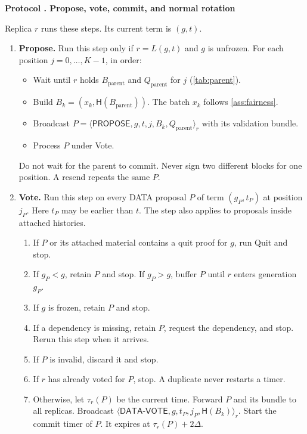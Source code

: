 \documentclass[11pt,a4paper]{article}
\newcommand{\RR}[1]{{\color{rrRed}#1}}
\newcommand{\Hash}{\mathsf H}
\newcommand{\tagg}[1]{\ensuremath{\mathsf{#1}}}
\newcounter{protocol}
\newenvironment{protocol}[2]{\refstepcounter{protocol}\label{#1}
\begin{mdframed}[nobreak=true,linewidth=.6pt,skipabove=8pt,skipbelow=8pt,
innertopmargin=7pt,innerbottommargin=7pt]\small
\textbf{Protocol \theprotocol. #2}\par\smallskip}{\end{mdframed}}
\begin{document}
\begin{protocol}{alg:steady}{Propose, vote, commit, and normal rotation}
Replica $r$ runs these steps. Its current term is $(g,t)$.
\begin{enumerate}[label=\textbf{\arabic*)},itemsep=5pt]
\item \textbf{Propose.} Run this step only if $r=L(g,t)$
\RR{and $g$ is unfrozen}.
For each position $j=0,\ldots,K-1$, in order:
 \begin{itemize}
 \item Wait until $r$ holds $B_{\mathrm{parent}}$ and
       $Q_{\mathrm{parent}}$ for $j$ \RR{(\cref{tab:parent})}.
 \item Build $B_k=(x_k,\Hash(B_{\mathrm{parent}}))$.
       The batch $x_k$ follows \cref{ass:fairness}.
 \item Broadcast
       $P=\langle\tagg{PROPOSE},g,t,j,B_k,Q_{\mathrm{parent}}\rangle_r$
       with its validation bundle.
 \item Process $P$ under Vote.
 \end{itemize}
 Do not wait for the parent to commit. Never sign two different
 blocks for one position. A resend repeats the same $P$.

\item \textbf{Vote.} Run this step on every DATA proposal $P$
of term $(g_P,t_P)$ at position $j_P$. \RR{Here $t_P$ may be earlier
than $t$. The step also applies to proposals inside attached histories.}
 \begin{enumerate}[label=(\alph*)]
 \item \RR{If $P$ or its attached material contains a quit proof for $g$,
       run Quit and stop.}
 \item If $g_P<g$, retain $P$ and stop. If $g_P>g$, buffer $P$
       until $r$ enters generation $g_P$.
 \item \RR{If $g$ is frozen, retain $P$ and stop.}
 \item If a dependency is missing, retain $P$, request the dependency,
       and stop. Rerun this step when it arrives.
 \item If $P$ is invalid, discard it and stop.
 \item If $r$ has already voted for $P$, stop.
       \RR{A duplicate never restarts a timer.}
 \item Otherwise, let $\tau_r(P)$ be the current time. Forward $P$ and
       its bundle to all replicas. Broadcast
       $\langle\tagg{DATA\mbox{-}VOTE},g,t_P,j_P,\Hash(B_k)\rangle_r$.
       Start the commit timer of $P$. It expires at $\tau_r(P)+2\Delta$.
 \end{enumerate}


\end{enumerate}
\end{protocol}
\end{document}

